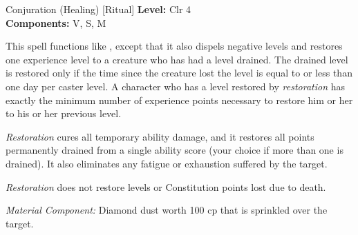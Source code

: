 {Conjuration (Healing) [Ritual]}
{
	\textbf{Level:}
	Clr 4\\
	\textbf{Components:}
	V, S, M\\
}
{
	This spell functions like , except that it also dispels negative levels and restores one experience level to a creature who has had a level drained. The drained level is restored only if the time since the creature lost the level is equal to or less than one day per caster level. A character who has a level restored by \emph{restoration} has exactly the minimum number of experience points necessary to restore him or her to his or her previous level.

	\emph{Restoration} cures all temporary ability damage, and it restores all points permanently drained from a single ability score (your choice if more than one is drained). It also eliminates any fatigue or exhaustion suffered by the target.

	\emph{Restoration} does not restore levels or Constitution points lost due to death.

	\textit{Material Component:}
	Diamond dust worth 100 cp that is sprinkled over the target.

}
